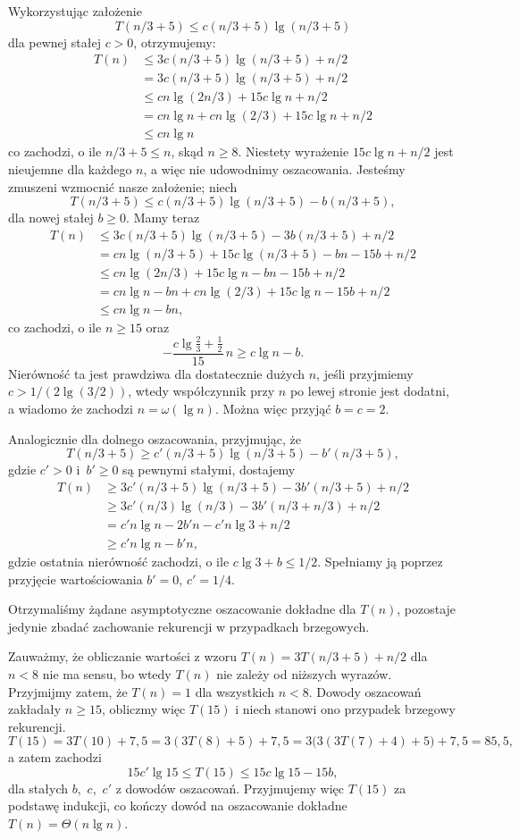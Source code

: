 Wykorzystując założenie
\[
	T(n/3+5) \le c(n/3+5)\lg(n/3+5)
\]
dla pewnej stałej $c>0$, otrzymujemy:
\begin{align*}
	T(n) &\le 3c(n/3+5)\lg(n/3+5)+n/2 \\
	&= 3c(n/3+5)\lg(n/3+5)+n/2 \\
	&\le cn\lg(2n/3)+15c\lg n+n/2 \\
	&= cn\lg n+cn\lg(2/3)+15c\lg n+n/2 \\
	&\le cn\lg n
\end{align*}
co zachodzi, o ile $n/3+5\le n$, skąd $n\ge8$. Niestety wyrażenie $15c\lg n+n/2$ jest nieujemne dla każdego $n$, a więc nie udowodnimy oszacowania. Jesteśmy zmuszeni wzmocnić nasze założenie; niech
\[
	T(n/3+5) \le c(n/3+5)\lg(n/3+5)-b(n/3+5),
\]
dla nowej stałej $b\ge0$. Mamy teraz
\begin{align*}
	T(n) &\le 3c(n/3+5)\lg(n/3+5)-3b(n/3+5)+n/2 \\
	&= cn\lg(n/3+5)+15c\lg(n/3+5)-bn-15b+n/2 \\
	&\le cn\lg(2n/3)+15c\lg n-bn-15b+n/2 \\
	&= cn\lg n-bn+cn\lg(2/3)+15c\lg n-15b+n/2 \\
	&\le cn\lg n-bn,
\end{align*}
co zachodzi, o ile $n\ge15$ oraz
\[
	-\frac{c\lg\frac{2}{3}+\frac{1}{2}}{15}\,n \ge c\lg n-b.
\]
Nierówność ta jest prawdziwa dla dostatecznie dużych $n$, jeśli przyjmiemy $c>1/(2\lg(3/2))$, wtedy współczynnik przy $n$ po lewej stronie jest dodatni, a wiadomo że zachodzi $n=\omega(\lg n)$. Można więc przyjąć $b=c=2$.

Analogicznie dla dolnego oszacowania, przyjmując, że
\[
	T(n/3+5) \ge c'(n/3+5)\lg(n/3+5)-b'(n/3+5),
\]
gdzie $c'>0$ i~$b'\ge0$ są pewnymi stałymi, dostajemy
\begin{align*}
	T(n) &\ge 3c'(n/3+5)\lg(n/3+5)-3b'(n/3+5)+n/2 \\
	&\ge 3c'(n/3)\lg(n/3)-3b'(n/3+n/3)+n/2 \\
	&= c'n\lg n-2b'n-c'n\lg3+n/2 \\
	&\ge c'n\lg n-b'n,
\end{align*}
gdzie ostatnia nierówność zachodzi, o ile $c\lg3+b\le1/2$. Spełniamy ją poprzez przyjęcie wartościowania $b'=0$, $c'=1/4$.

Otrzymaliśmy żądane asymptotyczne oszacowanie dokładne dla $T(n)$, pozostaje jedynie zbadać zachowanie rekurencji w przypadkach brzegowych.

Zauważmy, że obliczanie wartości z wzoru $T(n)=3T(n/3+5)+n/2$ dla $n<8$ nie ma sensu, bo wtedy $T(n)$ nie zależy od niższych wyrazów. Przyjmijmy zatem, że $T(n)=1$ dla wszystkich $n<8$. Dowody oszacowań zakładały $n\ge15$, obliczmy więc $T(15)$ i niech stanowi ono przypadek brzegowy rekurencji.
\[
	T(15) = 3T(10)+7{,}5 = 3(3T(8)+5)+7{,}5 = 3\bigl(3(3T(7)+4)+5\bigr)+7{,}5 = 85{,}5,
\]
a zatem zachodzi
\[
	15c'\lg15 \le T(15) \le 15c\lg15-15b,
\]
dla stałych $b$,~$c$,~$c'$ z dowodów oszacowań. Przyjmujemy więc $T(15)$ za podstawę indukcji, co kończy dowód na oszacowanie dokładne $T(n)=\Theta(n\lg n)$.

